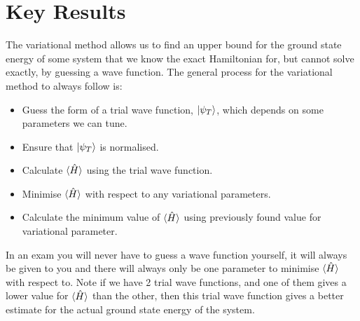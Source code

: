 \section{Key Results}

The variational method allows us to find an upper bound for the ground state energy of some system that we know the exact Hamiltonian for, but cannot solve exactly, by guessing a wave function. The general process for the variational method to always follow is:

\begin{itemize}
    \item Guess the form of a trial wave function, $\ket{\psi_T}$, which depends on some parameters we can tune.
    \item Ensure that $\ket{\psi_T}$ is normalised.
    \item Calculate $\braket{\Hat{H}}$ using the trial wave function.
    \item Minimise $\braket{\Hat{H}}$ with respect to any variational parameters.
    \item Calculate the minimum value of $\braket{\Hat{H}}$ using previously found value for variational parameter.
\end{itemize}

\noindent In an exam you will never have to guess a wave function yourself, it will always be given to you and there will always only be one parameter to minimise $\braket{\Hat{H}}$ with respect to. Note if we have 2 trial wave functions, and one of them gives a lower value for $\braket{\Hat{H}}$ than the other, then this trial wave function gives a better estimate for the actual ground state energy of the system.
